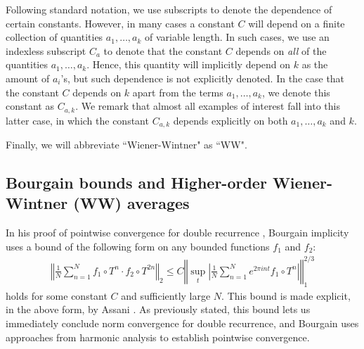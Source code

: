 \documentclass[11pt, oneside]{amsart}   	%
\newcommand{\1}{\mathbbm{1}}
\theoremstyle{definition}
\begin{document}
Following standard notation, we use subscripts to denote the dependence of certain constants. However, in many cases a constant $C$ will depend on a finite collection of quantities $a_1, \dots, a_k$ of variable length. In such cases, we use an indexless subscript $C_{a}$ to denote that the constant $C$ depends on \textit{all} of the quantities $a_1, \dots, a_k$. Hence, this quantity will implicitly depend on $k$ as the amount of $a_i$'s, but such dependence is not explicitly denoted. In the case that the constant $C$ depends on $k$ apart from the terms $a_1, \dots, a_k$, we denote this constant as $C_{a, k}$. We remark that almost all examples of interest fall into this latter case, in which the constant $C_{a, k}$ depends explicitly on both $a_1, \dots, a_k$ and $k$.

Finally, we will abbreviate ``Wiener-Wintner" as ``WW".


\subsection{Bourgain bounds and Higher-order Wiener-Wintner (WW) averages}\label{S:BB and av}
In his proof of pointwise convergence for double recurrence \cite{Bourgain}, Bourgain implicity uses a bound of the following form on any bounded functions $f_1$ and $f_2$:
\begin{align}\label{bourg}
\left\Vert \frac{1}{N}\sum_{n=1}^N f_1 \circ T^n \cdot f_2 \circ T^{2n} \right\Vert_2 \leq C\left\Vert \sup_{t}\left| \frac{1}{N}\sum_{n=1}^N e^{2\pi i n t} f_1\circ T^n \right| \right\Vert_1^{2/3}
\end{align}
holds for some constant $C$ and sufficiently large $N$. This bound is made explicit, in the above form, by Assani \cite{assani}. As previously stated, this bound lets us immediately conclude norm convergence for double recurrence, and Bourgain uses approaches from harmonic analysis to establish pointwise convergence.
\end{document}
